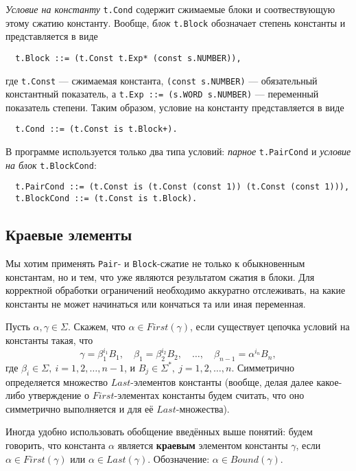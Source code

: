 \documentclass[12pt]{article}
\begin{document}
\textit{Условие на константу} \texttt{t.Cond} содержит сжимаемые блоки и
соотвествующую этому сжатию константу. Вообще, \textit{блок} \texttt{t.Block}
обозначает степень константы и представляется в виде
\begin{Verbatim}
  t.Block ::= (t.Const t.Exp* (const s.NUMBER)),
\end{Verbatim}
где \texttt{t.Const} --- сжимаемая константа, \texttt{(const s.NUMBER)} ---
обязательный константный показатель, а \texttt{t.Exp ::= (s.WORD s.NUMBER)}
--- переменный показатель степени. Таким образом, условие на константу
представляется в виде
\begin{Verbatim}
  t.Cond ::= (t.Const is t.Block+).
\end{Verbatim}
В программе используется только два типа условий: \textit{парное}
\texttt{t.PairCond} и \textit{условие на блок} \texttt{t.BlockCond}:
\begin{Verbatim}
  t.PairCond ::= (t.Const is (t.Const (const 1)) (t.Const (const 1))),
  t.BlockCond ::= (t.Const is t.Block).
\end{Verbatim}


\subsection{Краевые элементы} \label{base-bound}

Мы хотим применять \texttt{Pair}- и \texttt{Block}-сжатие не только к
обыкновенным константам, но и тем, что уже являются результатом сжатия в блоки.
Для корректной обработки ограничений необходимо аккуратно отслеживать, на какие
константы не может начинаться или кончаться та или иная переменная.

Пусть $\alpha, \gamma \in \Sigma$. Скажем, что $\alpha \in First(\gamma)$, если
существует цепочка условий на константы такая, что
\begin{displaymath}
  \gamma = \beta_1^{i_1} B_1, \quad \beta_1 = \beta_2^{i_2} B_2, \quad
  \dots, \quad \beta_{n-1} = \alpha^{i_n} B_n,
\end{displaymath}
где $\beta_i \in \Sigma, \ i = 1, 2, \dots, n - 1$, и $B_j \in \Sigma^*,
\ j = 1, 2, \dots, n$. Симметрично определяется множество $Last$-элементов
константы (вообще, делая далее какое-либо утверждение о $First$-элементах
константы будем считать, что оно симметрично выполняется и для её
$Last$-множества).

Иногда удобно использовать обобщение введённых выше понятий: будем
говорить, что константа $\alpha$ является \textbf{краевым} элементом константы
$\gamma$, если $\alpha \in First(\gamma)$ или $\alpha \in Last(\gamma)$.
Обозначение: $\alpha \in Bound(\gamma)$.
\end{document}
